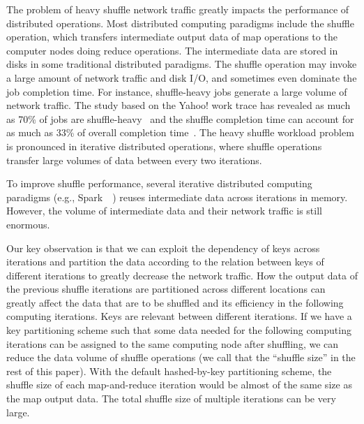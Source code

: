 \documentclass[10pt,journal,compsoc]{IEEEtran}
\newcommand{\blue}[1]{\textcolor{blue}{#1}}
\begin{document}
The problem of heavy shuffle network traffic greatly impacts the performance of distributed operations. 
Most distributed computing paradigms include the shuffle
operation, which transfers intermediate output data of map
operations to the computer nodes doing reduce operations.
The intermediate data are stored in disks in some traditional distributed paradigms. 
The shuffle operation may invoke a large amount of network traffic and disk I/O, 
and sometimes even dominate the job completion time. 
For instance, 
shuffle-heavy jobs generate a large volume of network traffic.
The study based on the Yahoo! work trace has revealed as much as 70\% of 
jobs are shuffle-heavy~\cite{chen2011case} and the shuffle completion
time can account for as much as 33\% of overall completion time~\cite{chowdhury2011managing, al2010hedera}.
The heavy shuffle workload problem is pronounced in iterative distributed operations, 
where shuffle operations transfer large volumes of data between every two iterations. 


To improve shuffle performance,  
several iterative distributed computing paradigms (e.g., Spark~~\cite{zaharia2012resilient}) 
reuses intermediate data across iterations in memory.
However, the volume of intermediate data and their network traffic is still enormous.  

Our key observation is that we can exploit the dependency of keys across iterations
and partition the data according to the relation between keys of different iterations to greatly decrease 
the network traffic.
How the output data of the
previous shuffle iterations are partitioned across different locations
can greatly affect the data that are to be
shuffled and its efficiency in the following computing iterations.
Keys are relevant between different iterations.
If we have a key partitioning scheme such that some data needed for the
following computing iterations can be assigned to the same computing
node after shuffling, we can reduce
the data volume of shuffle operations (we call that the
``shuffle size'' in the rest of this paper). 
With the default hashed-by-key partitioning scheme, the shuffle size of
each map-and-reduce iteration would be almost of the same size as the
map output data. The total shuffle size of multiple iterations
can be very large.
\end{document}
